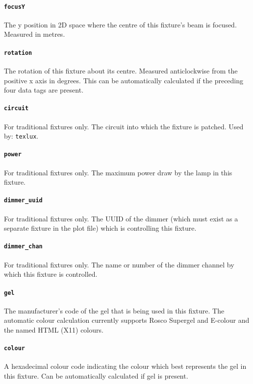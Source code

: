 \documentclass[a4paper]{article}
\begin{document}
\paragraph{\texttt{focusY}}
The y position in 2D space where the centre of this fixture's beam is 
focused. Measured in metres.

\paragraph{\texttt{rotation}}
The rotation of this fixture about its centre. Measured anticlockwise from 
the positive x axis in degrees. This can be automatically calculated if the 
preceding four data tags are present.

\paragraph{\texttt{circuit}}
For traditional fixtures only. The circuit into which the fixture is patched. 
Used by: \texttt{texlux}.

\paragraph{\texttt{power}}
For traditional fixtures only. The maximum power draw by the lamp in this 
fixture.

\paragraph{\texttt{dimmer\_uuid}}
For traditional fixtures only. The UUID of the dimmer (which must exist as a 
separate fixture in the plot file) which is controlling this fixture.

\paragraph{\texttt{dimmer\_chan}}
For traditional fixtures only. The name or number of the dimmer channel by 
which this fixture is controlled. 

\paragraph{\texttt{gel}}
The manufacturer's code of the gel that is being used in this fixture. The 
automatic colour calculation currently supports Rosco Supergel and E-colour 
and the named HTML (X11) colours.

\paragraph{\texttt{colour}}
A hexadecimal colour code indicating the colour which best represents the gel 
in this fixture. Can be automatically calculated if gel is present.
\end{document}
